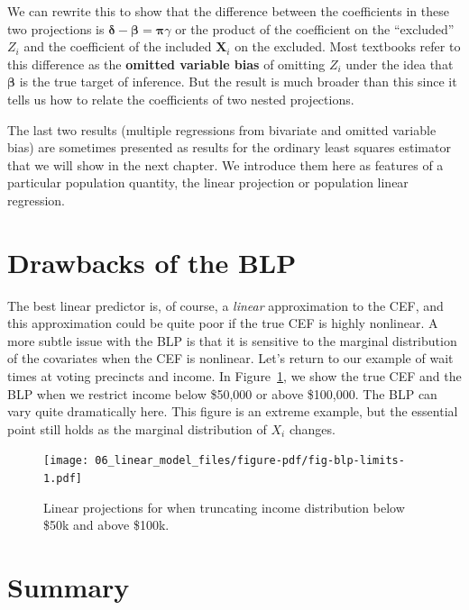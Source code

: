 \documentclass[
  letterpaper,
  DIV=11,
  numbers=noendperiod]{scrreprt}
\newcommand{\bs}{\symbf}
\newcommand{\mb}{\symbf}
\newcommand{\X}{\mb{X}}
\newcommand{\bfbeta}{\mb{\beta}}
\theoremstyle{plain}
\theoremstyle{definition}
\theoremstyle{definition}
\theoremstyle{remark}
\begin{document}
We can rewrite this to show that the difference between the coefficients
in these two projections is \(\bs{\delta} - \bfbeta= \bs{\pi}\gamma\) or
the product of the coefficient on the ``excluded'' \(Z_i\) and the
coefficient of the included \(\X_i\) on the excluded. Most textbooks
refer to this difference as the \textbf{omitted variable bias} of
omitting \(Z_i\) under the idea that \(\bfbeta\) is the true target of
inference. But the result is much broader than this since it tells us
how to relate the coefficients of two nested projections.

The last two results (multiple regressions from bivariate and omitted
variable bias) are sometimes presented as results for the ordinary least
squares estimator that we will show in the next chapter. We introduce
them here as features of a particular population quantity, the linear
projection or population linear regression.

\hypertarget{drawbacks-of-the-blp}{%
\section{Drawbacks of the BLP}\label{drawbacks-of-the-blp}}

The best linear predictor is, of course, a \emph{linear} approximation
to the CEF, and this approximation could be quite poor if the true CEF
is highly nonlinear. A more subtle issue with the BLP is that it is
sensitive to the marginal distribution of the covariates when the CEF is
nonlinear. Let's return to our example of wait times at voting precincts
and income. In Figure~\ref{fig-blp-limits}, we show the true CEF and the
BLP when we restrict income below \$50,000 or above \$100,000. The BLP
can vary quite dramatically here. This figure is an extreme example, but
the essential point still holds as the marginal distribution of \(X_i\)
changes.

\begin{figure}[th]

{\centering \texttt{[image: 06\_linear\_model\_files/figure-pdf/fig-blp-limits-1.pdf]}

}

\caption{\label{fig-blp-limits}Linear projections for when truncating
income distribution below \$50k and above \$100k.}

\end{figure}

\hypertarget{summary-4}{%
\section{Summary}\label{summary-4}}
\end{document}
